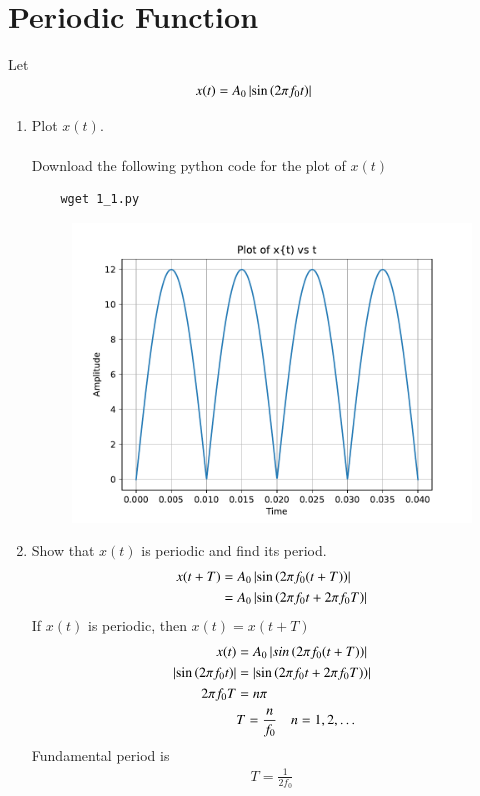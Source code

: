 \documentclass[journal,12pt,twocolumn]{IEEEtran}
\renewcommand\thesection{\arabic{section}}
\begin{document}
\section{Periodic Function}
Let 
\begin{align}
	x(t) &= A_0\left\vert\sin\left(2\pi f_0 t\right)\right\vert
	\label{eq:10-orig-diff-def}
\end{align}
\begin{enumerate}[label=\thesection.\arabic*
,ref=\thesection.\theenumi]

\item Plot $x(t)$. \\
\solution \\
Download the following python code for the plot of $x(t)$
\begin{lstlisting}
	wget 1_1.py
\end{lstlisting}
\begin{figure}[!ht]
	\centering
	\includegraphics[width=\columnwidth]{figs/1_1.pdf}
	\caption{}
	\label{fig:x(t)}
\end{figure}


\item Show that $x(t)$ is periodic and find its period.
\solution 
\begin{align}
	x(t + T) &= A_{0} \left\vert\sin{\ensuremath{\left(2 \pi f_0 (t + T)\right)}}\right\vert \\
		 &= A_{0} \left\vert\sin{\ensuremath{\left(2 \pi f_0 t + 2 \pi f_0 T\right)}}\right\vert 
\end{align}
If $x(t)$ is periodic, then $ x(t) = x(t + T)$
\begin{align}
	x(t) &= A_{0} \left\vert sin\left(2 \pi f_0 (t + T)\right)\right\vert \\
	\left\vert\sin{\ensuremath{\left(2 \pi f_0 t\right)}}\right\vert &= \left\vert\sin{\ensuremath{\left(2 \pi f_0 t + 2 \pi f_0 T)\right)}}\right\vert \\
	2 \pi f_0 T &= n \pi \\
		    &T = \frac{n}{f_0} \quad n = 1, 2, \dots 
\end{align}
Fundamental period is
\begin{align}
	T = \frac{1}{2 f_0}
\end{align}

\end{enumerate}
\end{document}
